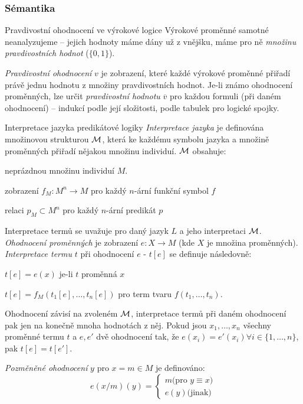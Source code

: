 \subsubsection*{Sémantika}

\begin{definiceN}{Pravdivostní ohodnocení ve výrokové logice}
Výrokové proměnné samotné neanalyzujeme -- jejich hodnoty máme dány už z vnějšku, máme pro ně \emph{množinu pravdivostních hodnot} ($\{0,1\}$).

\emph{Pravdivostní ohodnocení} $v$ je zobrazení, které každé výrokové proměnné přiřadí právě jednu hodnotu z množiny pravdivostních hodnot. Je-li známo ohodnocení proměnných, lze určit \emph{pravdivostní hodnotu} $\overline{v}$ pro každou formuli (při daném ohodnocení) -- indukcí podle její složitosti, podle tabulek pro logické spojky. 
\end{definiceN}


\begin{definiceN}{Interpretace jazyka predikátové logiky}
\emph{Interpretace jazyka} je definována množinovou strukturou $\mathcal{M}$, která ke každému symbolu jazyka a množině proměnných přiřadí nějakou množinu individuí. $\mathcal{M}$ obsahuje:
\begin{pitemize}
    \item neprázdnou množinu individuí $M$.
    \item zobrazení $f_M:M^n\to M$ pro každý $n$-ární funkční symbol $f$
    \item relaci $p_M\subset M^n$ pro každý $n$-ární predikát $p$
\end{pitemize}

Interpretace termů se uvažuje pro daný jazyk $L$ a jeho interpretaci $\mathcal{M}$. \emph{Ohodnocení proměnných} je zobrazení $e:X\to M$ (kde $X$ je množina proměnných). \emph{Interpretace termu} $t$ při ohodnocení $e$ - $t[e]$ se definuje následovně:
\begin{pitemize}
    \item $t[e]=e(x)$ je-li $t$ proměnná $x$
    \item $t[e]=f_M(t_1[e],\dots,t_n[e])$ pro term tvaru $f(t_1,\dots,t_n)$.
\end{pitemize}
Ohodnocení závisí na zvoleném $\mathcal{M}$, interpretace termů při daném ohodnocení pak jen na konečně mnoha hodnotách z něj. Pokud jsou $x_1,\dots,x_n$ všechny proměnné termu $t$ a $e,e'$ dvě ohodnocení tak, že $e(x_i)=e'(x_i) \forall i\in\{1,\dots,n\}$, pak $t[e]=t[e']$.

\emph{Pozměněné ohodnocení} $y$ pro $x = m\in M$ je definováno: $$e(x/m)(y)=
    \begin{cases}
	m \text{(pro $y\equiv x$)} \\
	e(y) \text{(jinak)}
    \end{cases}
    $$
\end{definiceN}

